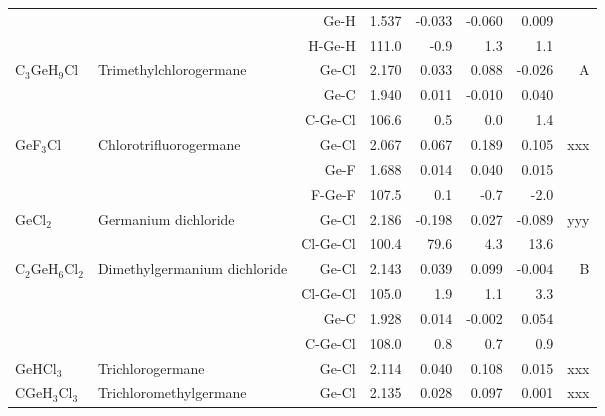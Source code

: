 \begin{table}
\begin{center}
\begin{tabular}{llrrrrrr}
             &                                    &Ge-H           &     1.537   &    -0.033 &    -0.060 &     0.009 &       \\
             &                                    &H-Ge-H       &     111.0   &      -0.9 &       1.3 &       1.1   &       \\
 C$_3$GeH$_9$Cl    & Trimethylchlorogermane             &Ge-Cl          &     2.170   &     0.033 &     0.088 &    -0.026 &     A \\
             &                                    &Ge-C           &     1.940   &     0.011 &    -0.010 &     0.040 &       \\
             &                                    &C-Ge-Cl      &     106.6   &       0.5 &       0.0 &       1.4   &       \\
 GeF$_3$Cl      & Chlorotrifluorogermane             &Ge-Cl          &     2.067   &     0.067 &     0.189 &     0.105 &   xxx \\
             &                                    &Ge-F           &     1.688   &     0.014 &     0.040 &     0.015 &       \\
             &                                    &F-Ge-F       &     107.5   &       0.1 &      -0.7 &      -2.0   &       \\
 GeCl$_2$       & Germanium dichloride               &Ge-Cl          &     2.186   &    -0.198 &     0.027 &    -0.089 &   yyy \\
             &                                    &Cl-Ge-Cl     &     100.4   &      79.6 &       4.3 &      13.6   &       \\
 C$_2$GeH$_6$Cl$_2$   & Dimethylgermanium dichloride       &Ge-Cl          &     2.143   &     0.039 &     0.099 &    -0.004 &     B \\
             &                                    &Cl-Ge-Cl     &     105.0   &       1.9 &       1.1 &       3.3   &       \\
             &                                    &Ge-C           &     1.928   &     0.014 &    -0.002 &     0.054 &       \\
             &                                    &C-Ge-Cl      &     108.0   &       0.8 &       0.7 &       0.9   &       \\
 GeHCl$_3$      & Trichlorogermane                   &Ge-Cl          &     2.114   &     0.040 &     0.108 &     0.015 &   xxx \\
 CGeH$_3$Cl$_3$    & Trichloromethylgermane             &Ge-Cl          &     2.135   &     0.028 &     0.097 &     0.001 &   xxx \\

\end{tabular}
\end{center}
\end{table}
